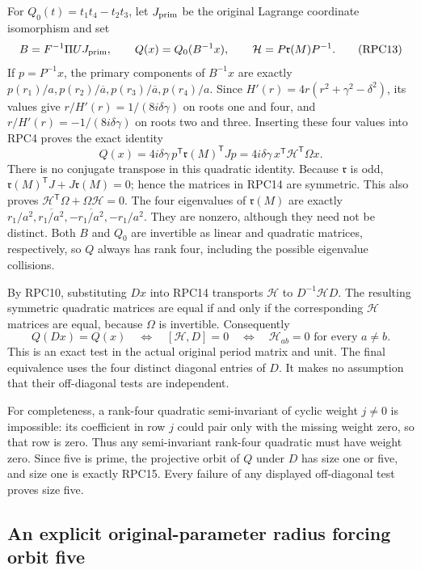 For $Q_0(t)=t_1t_4-t_2t_3$, let $J_{\rm prim}$ be the original
Lagrange coordinate isomorphism and set
\[
 B=F^{-1}\Pi UJ_{\rm prim},\qquad Q(x)=Q_0(B^{-1}x),\qquad
 \mathcal H=P\mathfrak r(M)P^{-1}.
 \tag{RPC13}
\]
If $p=P^{-1}x$, the primary components of $B^{-1}x$ are exactly
$p(r_1)/a,p(r_2)/\overline a,p(r_3)/\overline a,p(r_4)/a$.
Since $H'(r)=4r(r^2+\gamma^2-\delta^2)$, its values give
$r/H'(r)=1/(8i\delta\gamma)$ on roots one and four, and
$r/H'(r)=-1/(8i\delta\gamma)$ on roots two and three. Inserting
these four values into RPC4 proves the exact identity
\[
 \boxed{\quad Q(x)=4i\delta\gamma\,
       p^{\mathsf T}\mathfrak r(M)^{\mathsf T}Jp
       =4i\delta\gamma\,x^{\mathsf T}\mathcal H^{\mathsf T}\Omega x.\quad}
 \tag{RPC14}
\]
There is no conjugate transpose in this quadratic identity. Because
$\mathfrak r$ is odd, $\mathfrak r(M)^{\mathsf T}J+J\mathfrak r(M)=0$; hence the matrices in
RPC14 are symmetric. This also proves
$\mathcal H^{\mathsf T}\Omega+\Omega\mathcal H=0$.
The four eigenvalues of $\mathfrak r(M)$ are exactly
$r_1/a^2,\overline{r_1/a^2},-\overline{r_1/a^2},-r_1/a^2$.
They are nonzero, although they need not be distinct. Both $B$ and
$Q_0$ are invertible as linear and quadratic matrices, respectively,
so $Q$ always has rank four, including the possible eigenvalue collisions.

By RPC10, substituting $Dx$ into RPC14 transports $\mathcal H$ to
$D^{-1}\mathcal H D$. The resulting symmetric quadratic matrices
are equal if and only if the corresponding $\mathcal H$ matrices
are equal, because $\Omega$ is invertible. Consequently
\[
 \boxed{\quad Q(Dx)=Q(x)\quad\Longleftrightarrow\quad
 [\mathcal H,D]=0\quad\Longleftrightarrow\quad
 \mathcal H_{ab}=0\text{ for every }a\ne b.\quad}
 \tag{RPC15}
\]
This is an exact test in the actual original period matrix and unit.
The final equivalence uses the four distinct diagonal entries of $D$.
It makes no assumption that their off-diagonal tests are independent.

For completeness, a rank-four quadratic semi-invariant of cyclic
weight $j\ne0$ is impossible: its coefficient in row $j$ could pair
only with the missing weight zero, so that row is zero. Thus any
semi-invariant rank-four quadratic must have weight zero. Since five
is prime, the projective orbit of $Q$ under $D$ has size one or five,
and size one is exactly RPC15. Every failure of any displayed
off-diagonal test proves size five.

\subsection{An explicit original-parameter radius forcing orbit five}

